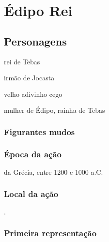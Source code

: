 

\newcommand{\NL}[1]{%
 \marginpar[\raggedleft\footnotesize #1]{\raggedright\footnotesize #1}}

\part{Édipo Rei}

\chapter{Personagens}

 rei de Tebas


 irmão de Jocasta


 velho adivinho cego

 mulher de Édipo, rainha de Tebas





\section{Figurantes mudos} 







\section{Época da ação} 

 da Grécia, entre 1200 e 1000 a.C.

\section{Local da ação} 

.

\section{Primeira representação} 


